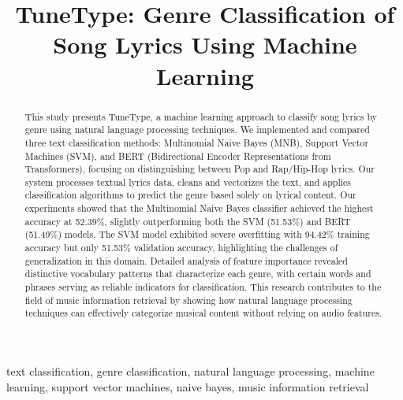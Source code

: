 \documentclass[conference]{IEEEtran}
\begin{document}
\title{TuneType: Genre Classification of Song Lyrics Using Machine Learning}

\author{
\and
{}
\and
{}
}

\maketitle

\begin{abstract}
This study presents TuneType, a machine learning approach to classify song lyrics by genre using natural language processing techniques. We implemented and compared three text classification methods: Multinomial Naive Bayes (MNB), Support Vector Machines (SVM), and BERT (Bidirectional Encoder Representations from Transformers), focusing on distinguishing between Pop and Rap/Hip-Hop lyrics. Our system processes textual lyrics data, cleans and vectorizes the text, and applies classification algorithms to predict the genre based solely on lyrical content. Our experiments showed that the Multinomial Naive Bayes classifier achieved the highest accuracy at 52.39\%, slightly outperforming both the SVM (51.53\%) and BERT (51.49\%) models. The SVM model exhibited severe overfitting with 94.42\% training accuracy but only 51.53\% validation accuracy, highlighting the challenges of generalization in this domain. Detailed analysis of feature importance revealed distinctive vocabulary patterns that characterize each genre, with certain words and phrases serving as reliable indicators for classification. This research contributes to the field of music information retrieval by showing how natural language processing techniques can effectively categorize musical content without relying on audio features.
\end{abstract}

\begin{IEEEkeywords}
text classification, genre classification, natural language processing, machine learning, support vector machines, naive bayes, music information retrieval
\end{IEEEkeywords}
\end{document}
